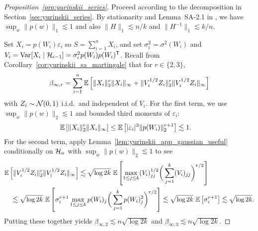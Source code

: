 \begin{proof}[Proposition~\ref{pro:yurinskii_series}]

  Proceed according to the decomposition in
  Section~\ref{sec:yurinskii_series}.
  By stationarity and Lemma~SA-2.1 in
  \citet{cattaneo2020large},
  we have $\sup_w \|p(w)\|_1 \lesssim 1$
  and also $\|H\|_1 \lesssim n/k$
  and $\|H^{-1}\|_1 \lesssim k/n$.


  Set $X_i = p(W_i) \varepsilon_i$
  so $S = \sum_{i=1}^n X_i$,
  and set $\sigma^2_i = \sigma^2(W_i)$ and
  $V_i = \operatorname{Var}[X_i \mid \mathcal{H}_{i-1}] = \sigma_i^2 p(W_i) p(W_i)^{\mathsf{T}}$.
  Recall from Corollary~\ref{cor:yurinskii_sa_martingale} that for
  $r \in \{2,3\}$,
  \begin{align*}
    \beta_{\infty,r}
    = \sum_{i=1}^n \mathbb{E}\left[\| X_i \|^r_2 \| X_i \|_\infty
    + \|V_i^{1/2} Z_i \|^r_2 \|V_i^{1/2} Z_i \|_\infty \right]
  \end{align*}
  with $Z_i \sim \mathcal{N}(0,1)$ i.i.d.\ and independent of $V_i$.
  For the first term, we use
  $\sup_w \|p(w)\|_2 \lesssim 1$
  and bounded third moments of $\varepsilon_i$:
  \begin{align*}
    \mathbb{E}\left[ \| X_i \|^r_2 \| X_i \|_\infty \right]
    &\leq
    \mathbb{E}\left[ |\varepsilon_i|^3 \| p(W_i) \|^{r+1}_2 \right]
    \lesssim 1.
  \end{align*}
  For the second term, apply Lemma~\ref{lem:yurinskii_app_gaussian_useful}
  conditionally on
  $\mathcal{H}_n$ with $\sup_w \|p(w)\|_2 \lesssim 1$ to see
  \begin{align*}
    &\mathbb{E}\left[ \|V_i^{1/2} Z_i \|^r_2 \|V_i^{1/2} Z_i \|_\infty \right]
    \lesssim
    \sqrt{\log 2k} \
    \mathbb{E}\left[
      \max_{1 \leq j \leq k}
      (V_i)_{j j}^{1/2}
      \bigg( \sum_{j=1}^k (V_i)_{j j} \bigg)^{r/2}
    \right] \\
    &\quad\lesssim
    \sqrt{\log 2k} \
    \mathbb{E}\left[
      \sigma_i^{r+1}
      \max_{1 \leq j \leq k}
      p(W_i)_j
      \bigg(
        \sum_{j=1}^k
        p(W_i)_{j}^2
      \bigg)^{r/2}
    \right]
    \lesssim
    \sqrt{\log 2k} \
    \mathbb{E}\left[
      \sigma_i^{r+1}
    \right]
    \lesssim
    \sqrt{\log 2k}.
  \end{align*}
  Putting these together yields
  $\beta_{\infty,2} \lesssim n \sqrt{\log 2k}$
  and $\beta_{\infty,3} \lesssim n \sqrt{\log 2k}$.

  \proofparagraph{bounding $\Omega$}


\end{proof}
